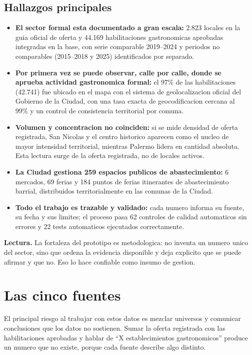 \documentclass[11pt,a4paper]{article}
\begin{document}
\subsection*{Hallazgos principales}
\begin{itemize}[leftmargin=*]
\item \textbf{El sector formal esta documentado a gran escala:} 2.823 locales en la guia oficial de oferta y 44.169 habilitaciones gastronomicas aprobadas integradas en la base, con serie comparable 2019--2024 y periodos no comparables (2015--2018 y 2025) identificados por separado.
\item \textbf{Por primera vez se puede observar, calle por calle, donde se aprueba actividad gastronomica formal:} el 97\% de las habilitaciones (42.741) fue ubicado en el mapa con el sistema de geolocalizacion oficial del Gobierno de la Ciudad, con una tasa exacta de geocodificacion cercana al 99\% y un control de consistencia territorial por comuna.
\item \textbf{Volumen y concentracion no coinciden:} si se mide densidad de oferta registrada, San Nicolas y el centro historico aparecen como el nucleo de mayor intensidad territorial, mientras Palermo lidera en cantidad absoluta. Esta lectura surge de la oferta registrada, no de locales activos.
\item \textbf{La Ciudad gestiona 259 espacios publicos de abastecimiento:} 6 mercados, 69 ferias y 184 puntos de ferias itinerantes de abastecimiento barrial, distribuidos territorialmente en las comunas de la Ciudad.
\item \textbf{Todo el trabajo es trazable y validado:} cada numero informa su fuente, su fecha y sus limites; el proceso pasa 62 controles de calidad automaticos sin errores y 22 tests automaticos ejecutados correctamente.
\end{itemize}
\begin{lectura}\textbf{Lectura.} La fortaleza del prototipo es metodologica: no inventa un numero unico del sector, sino que ordena la evidencia disponible y deja explicito que se puede afirmar y que no. Eso lo hace confiable como insumo de gestion.\end{lectura}

\section*{Las cinco fuentes}
El principal riesgo al trabajar con estos datos es mezclar universos y comunicar conclusiones que los datos no sostienen. Sumar la oferta registrada con las habilitaciones aprobadas y hablar de ``X establecimientos gastronomicos'' produce un numero que no existe, porque cada fuente describe algo distinto.
\vspace{4pt}
\end{document}
